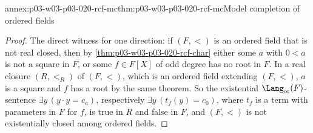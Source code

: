 \begin{annexitem}{annex:p03-w03-p03-020-rcf-mc}{thm:p03-w03-p03-020-rcf-mc}{Model completion of ordered fields}
\begin{proof}
The direct witness for one direction: if \((F,<)\) is an ordered field that
is not real closed, then by \cref{thm:p03-w03-p03-020-rcf-char}
either some \(a\) with \(0<a\) is not a square in \(F\), or some \(f\in
F[X]\) of odd degree has no root in \(F\). In a real closure \((R,<_R)\) of
\((F,<)\), which is an ordered field extending \((F,<)\), \(a\) is a square
and \(f\) has a root by the same theorem. So the existential
\(\Lang_{\mathrm{or}}(F)\)-sentence \(\exists y\,(y\mathbin{\cdot}y=c_a)\),
respectively \(\exists y\,(t_f(y)=c_0)\), where \(t_f\) is a term with
parameters in \(F\) for \(f\), is true in \(R\) and false in \(F\), and
\((F,<)\) is not existentially closed among ordered fields.
\end{proof}
\end{annexitem}
